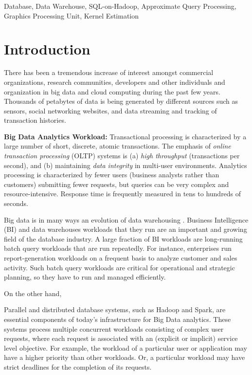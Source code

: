 \documentclass[conference]{IEEEtran}
\begin{document}
\begin{IEEEkeywords}
Database, Data Warehouse, SQL-on-Hadoop, Approximate Query Processing, Graphics Processing Unit, Kernel Estimation
\end{IEEEkeywords}

\section{Introduction}
\label{sc:Introduction}
There has been a tremendous increase of interest amongst commercial organizations, research communities, developers and other individuals and organization in big data and cloud computing during the past few years. Thousands of petabytes of data is being generated by different sources such as sensors, social networking websites, and data streaming and tracking of transaction histories. 

\noindent
\textbf{Big Data Analytics Workload:}
Transactional processing is characterized by a large number of short, discrete, atomic transactions. 
The emphasis of \textit{online transaction processing} (OLTP) systems is (a) \textit{high throughput }(transactions per second), 
and (b) maintaining \textit{data integrity} in multi-user environments.
Analytics processing is characterized by fewer users (business analysts rather than customers) submitting fewer requests, 
but queries can be very complex and resource-intensive. Response time is frequently measured in tens to hundreds of seconds.

Big data is in many ways an evolution of data warehousing \cite{Zaharia:2010}.
Business Intelligence (BI) and data warehouses workloads that they run are an important and growing field of the database industry.
A large fraction of BI workloads are long-running batch query workloads that are run repeatedly.
For instance, enterprises run report-generation workloads on a frequent basis to analyze customer and sales activity.
Such batch query workloads are critical for operational and strategic planning, so they have to run and managed efficiently.

On the other hand, 

Parallel and distributed database systems, such as Hadoop and Spark, are essential components of today’s infrastructure for Big Data analytics. 
These systems process multiple concurrent workloads consisting of complex user requests, where each request is associated with an (explicit or implicit) service level objective. For example, the workload of a particular user or application may have a higher priority than other workloads. Or, a particular workload may have strict deadlines for the completion of its requests.
\end{document}
